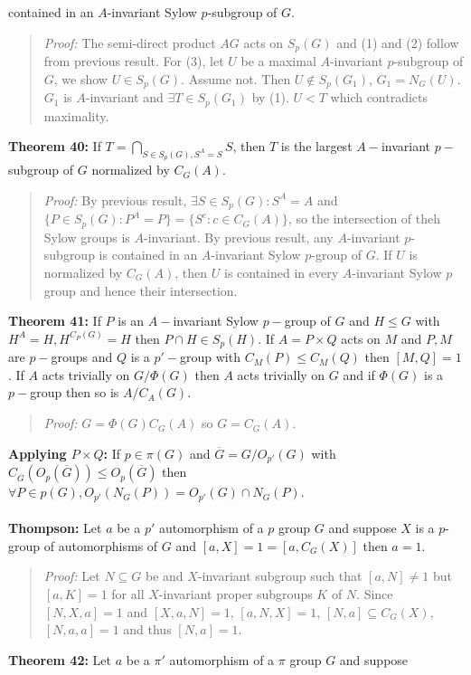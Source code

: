 contained in an $A$-invariant Sylow $p$-subgroup of $G$.
\begin{quote}
\emph{Proof:}  
The semi-direct product $AG$ acts on $S_p(G)$ and (1) and (2) follow from previous result.
For (3), let $U$ be a maximal $A$-invariant $p$-subgroup of $G$, we show $U \in S_p(G)$. 
Assume not.  Then $U \notin S_p(G_1)$, $G_1 = N_G(U)$.  $G_1$ is $A$-invariant and $\exists T \in S_p(G_1)$
by (1).  $U<T$ which contradicts maximality.
\end{quote}
{\bf Theorem 40:}
If $T=\bigcap_{S \in S_p(G), S^A=S} S$,
then $T$ is the largest $A-$invariant $p-$subgroup of $G$ normalized by $C_G(A)$.
\begin{quote}
\emph{Proof:}  
By previous result, $\exists S \in S_p(G): S^A=A$ and
$\{P \in S_p(G): P^A=P \} = \{S^c: c \in C_G(A) \}$, so the intersection of theh Sylow groups is
$A$-invariant. By previous result, any $A$-invariant $p$-subgroup is contained in an $A$-invariant
Sylow $p$-group of $G$.  If $U$ is normalized by $C_G(A)$, then $U$ is contained in every $A$-invariant
Sylow $p$ group and hence their intersection.
\end{quote}
{\bf Theorem 41:}
If $P$ is an $A-$invariant Sylow $p-$group of $G$ and $H \le G$ with $H^A=H, H^{C_P(G)}=H$ then
$P \cap H \in S_p(H)$.  If $A= P \times Q$ acts on $M$ and $P, M$ are $p-$groups and
$Q$ is a $p'-$group with $C_M(P) \le C_M(Q)$ then $[M,Q]=1$. If $A$ acts trivially on
$G/\Phi(G)$ then $A$ acts trivially on $G$ and if $\Phi(G)$ is a $p-$group then
so is $A/C_A(G)$. 
\begin{quote}
\emph{Proof:}  
$G= \Phi(G) C_G(A)$ so $G= C_G(A)$.
\end{quote}
{\bf Applying $P \times Q$:} If $p \in \pi(G)$ and ${\overline G}= G/O_{p'}(G)$
with $C_{\overline G}(O_p({\overline G})) \le O_p({\overline G})$ then 
$\forall P \in p(G), O_{p'}(N_G(P))=O_{p'}(G) \cap N_G(P)$.
\\
\\
{\bf Thompson:} Let $a$ be a $p'$ automorphism of a $p$ group $G$ and suppose
$X$ is a $p$-group of automorphisms of $G$ and
$[a,X]=1=[a,C_G(X)]$ then $a=1$.
\begin{quote}
\emph{Proof:}  
Let $N \subseteq G$ be and $X$-invariant subgroup such that $[a,N] \ne 1$ but
$[a, K]= 1$ for all $X$-invariant proper subgroups $K$ of $N$.  Since
$[N,X,a]=1$ and $[X,a,N]=1$,  $[a, N, X] = 1$, $[N,a] \subseteq C_G(X)$,
$[N,a,a]= 1$ and thus $[N,a]= 1$.
\end{quote}
{\bf Theorem 42:} Let $a$ be a $\pi'$ automorphism of a $\pi$ group $G$ and suppose
